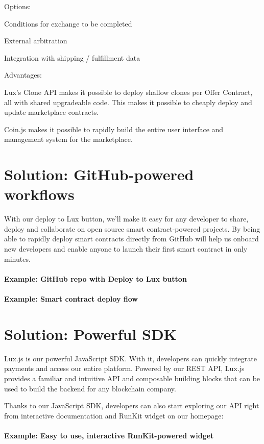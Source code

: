 \documentclass[11pt]{article}
\begin{document}
Options:


Conditions for exchange to be completed


External arbitration


Integration with shipping / fulfillment data


Advantages:


Lux's Clone API makes it possible to deploy shallow clones per Offer Contract, all with shared upgradeable code. This makes it possible to cheaply deploy and update marketplace contracts.


Coin.js makes it possible to rapidly build the entire user interface and management system for the marketplace.


\section{Solution: GitHub-powered workflows}

With our deploy to Lux button, we'll make it easy for any developer to share, deploy and collaborate on open source smart contract-powered projects. By being able to rapidly deploy smart contracts directly from GitHub will help us onboard new developers and enable anyone to launch their first smart contract in only minutes.


\paragraph{Example: GitHub repo with Deploy to Lux button}

\paragraph{Example: Smart contract deploy flow}

\section{Solution: Powerful SDK}

Lux.js is our powerful JavaScript SDK. With it, developers can quickly integrate payments and access our entire platform. Powered by our REST API, Lux.js provides a familiar and intuitive API and composable building blocks that can be used to build the backend for any blockchain company.


Thanks to our JavaScript SDK, developers can also start exploring our API right from interactive documentation and RunKit widget on our homepage:


\paragraph{Example: Easy to use, interactive RunKit-powered widget}
\end{document}
